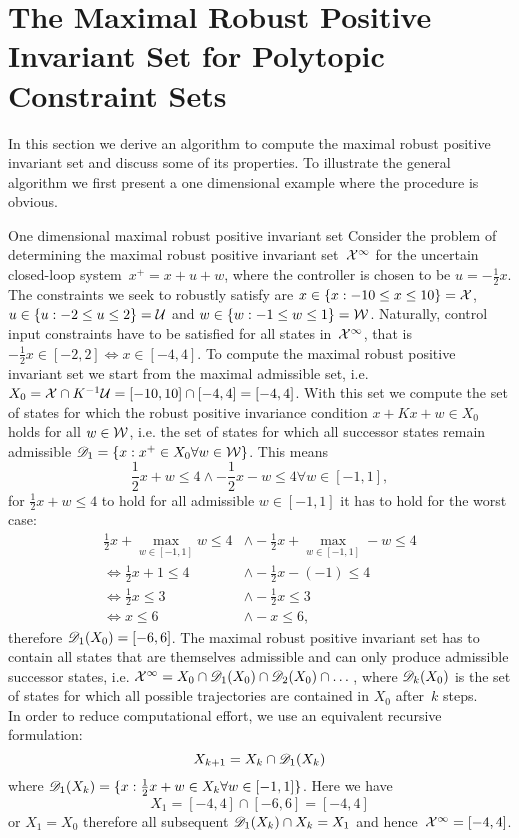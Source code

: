 \section{The Maximal Robust Positive Invariant Set for Polytopic Constraint Sets}\label{ch:MPC:sec:qMPC:MRPI:set}
%
%
\mysplit In this section we derive an algorithm to compute the maximal robust positive invariant set and discuss some of its properties.
%
To illustrate the general algorithm we first present a one dimensional example where the procedure is obvious.
%
\begin{example}{One dimensional maximal robust positive invariant set}\label{example:MRPI:set}
%
Consider the problem of determining the maximal robust positive invariant set~$\mathcal X^\infty$ for the uncertain closed-loop system~$x^+=x+u+w$, where the controller is chosen to be $u = -\frac{1}{2}x$.
%
The constraints we seek to robustly satisfy are $x\in\{x:-10\leq x\leq10\}=\mathcal X$, $u\in\{u:-2\leq u\leq 2\}=\mathcal U$ and $w\in\{w:-1\leq w\leq1\}=\mathcal W$.
%
Naturally, control input constraints have to be satisfied for all states in~$\mathcal X^\infty$, that is $-\frac{1}{2}x\in[-2,2]\Leftrightarrow x\in[-4,4]$.
%
To compute the maximal robust positive invariant set we start from the maximal admissible set, i.e. $X_0 = \mathcal X\cap K^{-1}\mathcal U = [-10,10]\cap[-4,4]=[-4,4]$.
% 
With this set we compute the set of states for which the robust positive invariance condition $x+Kx+w\in X_0$ holds for all $w\in\mathcal W$, i.e. the set of states for which all successor states remain admissible $\mathscr D_1 = \{x:x^+\in X_0\forall w\in\mathcal W\}$.
%
This means
%
\[
\frac{1}{2}x+w\leq 4 \wedge -\frac{1}{2}x-w\leq 4 \forall w\in[-1,1],
\]
%
for $\frac{1}{2}x+w\leq 4$ to hold for all admissible $w\in[-1,1]$ it has to hold for the worst case:
%
\[\begin{aligned}
\frac{1}{2}x+\max_{w\in[-1,1]}w\leq 4 &\wedge -\frac{1}{2}x+\max_{w\in[-1,1]}-w \leq 4\\
\Leftrightarrow\frac{1}{2}x+1\leq 4&\wedge-\frac{1}{2}x-(-1) \leq 4\\
\Leftrightarrow\frac{1}{2}x\leq 3&\wedge -\frac{1}{2}x\leq 3\\
\Leftrightarrow x\leq6&\wedge -x\leq 6,
\end{aligned}
\]
%
therefore $\mathscr D_1(X_0) = [-6,6]$. 
%
The maximal robust positive invariant set has to contain all states that are themselves admissible and can only produce admissible successor states, i.e. $\mathcal X^\infty = X_0\cap\mathscr D_1(X_0)\cap\mathscr D_2(X_0)\cap\dots$, where $\mathscr D_k(X_0)$ is the set of states for which all possible trajectories are contained in $X_0$ after~$k$ steps.
%
\\[1em]
%
In order to reduce computational effort, we use an equivalent recursive formulation: 
%
$$
	X_{k+1} = X_k\cap\mathscr D_1(X_k)
$$
%
where $\mathscr D_1(X_k) = \{x: \frac{1}{2}x+w\in X_k\forall w\in[-1,1]\}$.
%
Here we have 
%
$$
X_1 = [-4,4] \cap [-6,6] = [-4,4]
$$
%
or $X_1=X_0$ therefore all subsequent $\mathscr D_1(X_k) \cap X_k=X_1$ and hence~$\mathcal X^\infty = [-4,4]$.
\end{example}
